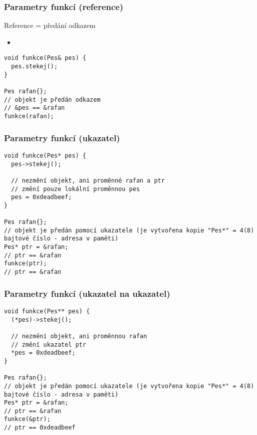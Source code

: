 \begin{frame}[fragile]
\frametitle{Parametry funkcí (reference)}
\begin{bitemize}
\item Reference = předání odkazem
\begin{itemize}
\item {}
\end{itemize}
\end{bitemize}

\begin{yesblock}
\begin{lstlisting}
void funkce(Pes& pes) {
  pes.stekej();
}

Pes rafan{};
// objekt je předán odkazem
// &pes == &rafan
funkce(rafan);
\end{lstlisting}
\end{yesblock}
\end{frame}


\begin{frame}[fragile]
\frametitle{Parametry funkcí (ukazatel)}

\begin{yesblock}
\begin{lstlisting}
void funkce(Pes* pes) {
  pes->stekej();

  // nezmění objekt, ani proměnné rafan a ptr
  // změní pouze lokální proměnnou pes
  pes = 0xdeadbeef;
}

Pes rafan{};
// objekt je předán pomocí ukazatele (je vytvořena kopie "Pes*" = 4(8) bajtové číslo - adresa v paměti)
Pes* ptr = &rafan;
// ptr == &rafan
funkce(ptr);
// ptr == &rafan
\end{lstlisting}
\end{yesblock}
\end{frame}




\begin{frame}[fragile]
\frametitle{Parametry funkcí (ukazatel na ukazatel)}

\begin{yesblock}
\begin{lstlisting}
void funkce(Pes** pes) {
  (*pes)->stekej();

  // nezmění objekt, ani proměnnou rafan
  // změní ukazatel ptr
  *pes = 0xdeadbeef;
}

Pes rafan{};
// objekt je předán pomocí ukazatele (je vytvořena kopie "Pes*" = 4(8) bajtové číslo - adresa v paměti)
Pes* ptr = &rafan;
// ptr == &rafan
funkce(&ptr);
// ptr == 0xdeadbeef
\end{lstlisting}
\end{yesblock}
\end{frame}




